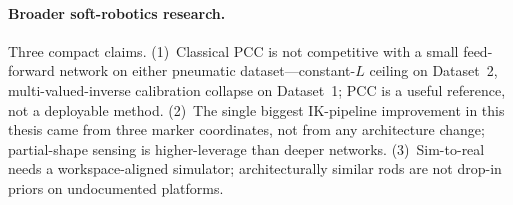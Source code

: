 \paragraph{Broader soft-robotics research.}
Three compact claims. (1)~Classical PCC is not competitive with a small feed-forward network on either pneumatic dataset---constant-$L$ ceiling on Dataset~2, multi-valued-inverse calibration collapse on Dataset~1; PCC is a useful reference, not a deployable method. (2)~The single biggest IK-pipeline improvement in this thesis came from three marker coordinates, not from any architecture change; partial-shape sensing is higher-leverage than deeper networks. (3)~Sim-to-real needs a workspace-aligned simulator; architecturally similar rods are not drop-in priors on undocumented platforms.
